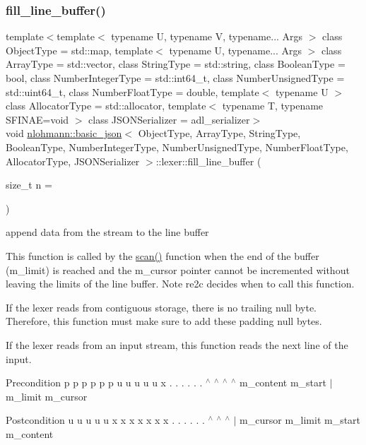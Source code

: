 \subsubsection{\texorpdfstring{fill\+\_\+line\+\_\+buffer()}{fill\_line\_buffer()}}
{\footnotesize\ttfamily template$<$template$<$ typename U, typename V, typename... Args $>$ class Object\+Type = std\+::map, template$<$ typename U, typename... Args $>$ class Array\+Type = std\+::vector, class String\+Type  = std\+::string, class Boolean\+Type  = bool, class Number\+Integer\+Type  = std\+::int64\+\_\+t, class Number\+Unsigned\+Type  = std\+::uint64\+\_\+t, class Number\+Float\+Type  = double, template$<$ typename U $>$ class Allocator\+Type = std\+::allocator, template$<$ typename T, typename S\+F\+I\+N\+A\+E=void $>$ class J\+S\+O\+N\+Serializer = adl\+\_\+serializer$>$ \\
void \hyperlink{classnlohmann_1_1basic__json}{nlohmann\+::basic\+\_\+json}$<$ Object\+Type, Array\+Type, String\+Type, Boolean\+Type, Number\+Integer\+Type, Number\+Unsigned\+Type, Number\+Float\+Type, Allocator\+Type, J\+S\+O\+N\+Serializer $>$\+::lexer\+::fill\+\_\+line\+\_\+buffer (\begin{DoxyParamCaption}\item[{size\+\_\+t}]{n = {} }\end{DoxyParamCaption})\hspace{0.3cm}{\ttfamily [inline]}}



append data from the stream to the line buffer 

This function is called by the \hyperlink{classnlohmann_1_1basic__json_1_1lexer_aa2bf285bc6ee37e2af87dfd627224b41}{scan()} function when the end of the buffer ({\ttfamily m\+\_\+limit}) is reached and the {\ttfamily m\+\_\+cursor} pointer cannot be incremented without leaving the limits of the line buffer. Note re2c decides when to call this function.

If the lexer reads from contiguous storage, there is no trailing null byte. Therefore, this function must make sure to add these padding null bytes.

If the lexer reads from an input stream, this function reads the next line of the input.

\begin{DoxyPrecond}{Precondition}
p p p p p p u u u u u x . . . . . . $^\wedge$ $^\wedge$ $^\wedge$ $^\wedge$ m\+\_\+content m\+\_\+start $\vert$ m\+\_\+limit m\+\_\+cursor
\end{DoxyPrecond}
\begin{DoxyPostcond}{Postcondition}
u u u u u x x x x x x x . . . . . . $^\wedge$ $^\wedge$ $^\wedge$ $\vert$ m\+\_\+cursor m\+\_\+limit m\+\_\+start m\+\_\+content 
\end{DoxyPostcond}
\mbox{\label{classnlohmann_1_1basic__json_1_1lexer_a53a951162c3efbb881b4a31e1f4d6f67}} 
